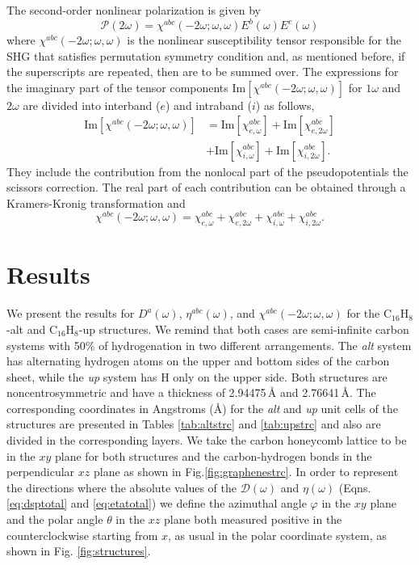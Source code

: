 \documentclass[pss]{wiley2sp} %
\begin{document}
The second-order nonlinear polarization is given by
\begin{equation*}\label{eq:pol}
\mathcal{P}(2\omega) = 
\chi^{abc}(-2\omega;\omega,\omega)E^{b}(\omega)E^{c}(\omega)
\end{equation*} where $\chi^{abc}(-2\omega;\omega,\omega)$ is the nonlinear susceptibility tensor responsible for the SHG that satisfies permutation symmetry condition and, as mentioned before,  if the superscripts are repeated, then are to be summed over. The expressions for the imaginary part of the tensor components $\mathrm{Im}[\chi^{abc}(-2\omega;\omega,\omega)]$ for $1\omega$ and $2\omega$ are divided into interband ($e$) and intraband ($i$) as follows, 
\begin{align*}\label{eq:chiim}
\mathrm{Im}[\chi^{abc} (-2\omega;\omega,\omega)] &=
\mathrm{Im}[\chi^{abc}_{e,\omega}] + \mathrm{Im}[\chi^{abc}_{e,2\omega}] \\
& + 
\mathrm{Im}[\chi^{abc}_{i,\omega}] + \mathrm{Im}[\chi^{abc}_{i,2\omega}].
\end{align*}
They include the contribution from the
nonlocal part of the pseudopotentials the scissors correction. The real part
of each contribution can be obtained through a Kramers-Kronig transformation
\cite{tancognePRB14} and
\begin{equation}\label{eq:chitotal}
\chi^{abc} (-2\omega;\omega,\omega) =
\chi^{abc}_{e,\omega} + \chi^{abc}_{e,2\omega} +
\chi^{abc}_{i,\omega} + \chi^{abc}_{i,2\omega}.
\end{equation}


\section{Results}\label{sec:results}

We present the results for {$D^{a}(\omega)$}, {$\eta^{abc}(\omega)$}, and
$\chi^{abc}(-2\omega;\omega,\omega)$ for the C$_{16}$H$_{8}$-alt and
C$_{16}$H$_{8}$-up structures. We remind that both cases are semi-infinite
carbon systems with 50\% of hydrogenation in two different arrangements. The
\emph{alt} system has alternating hydrogen atoms on the upper and bottom sides
of the carbon sheet, while the \emph{up} system has H only on the upper side.
Both structures are noncentrosymmetric and have a thickness of 2.94475\,{\AA}
and 2.76641\,{\AA}. The corresponding coordinates in Angstroms (\AA) for the
\emph{alt} and \emph{up} unit cells of the structures are presented in Tables
\ref{tab:altstrc} and \ref{tab:upstrc} and also are divided in the corresponding
layers. We take the carbon honeycomb lattice to be in the $xy$ plane for both
structures and the carbon-hydrogen bonds in the perpendicular $xz$ plane as
shown in Fig.\ref{fig:graphenestrc}. In order to represent the directions where
the absolute values of the $\mathcal{D}(\omega)$ and $\eta(\omega)$ (Eqns.
\eqref{eq:dsptotal} and \eqref{eq:etatotal}) we define the azimuthal angle
$\varphi$ in the $xy$ plane and the polar angle $\theta$ in the $xz$ plane both
measured positive in the counterclockwise starting from $x$, as usual in the
polar coordinate system, as shown in Fig. \ref{fig:structures}.
\end{document}
